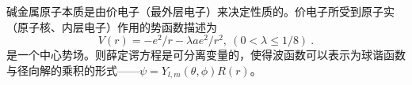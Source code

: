 

碱金属原子本质是由价电子（最外层电子）来决定性质的。价电子所受到原子实（原子核、内层电子）作用的势函数描述为
\begin{equation}
V(r) = -e^2/r - \lambda a e^2/r^2, \ (0 < \lambda \le 1/8) ~.
\end{equation}
是一个中心势场。则薛定谔方程是可分离变量的，使得波函数可以表示为球谐函数与径向解的乘积的形式——$\psi = Y_{l, m}(\theta, \phi) R(r)$。